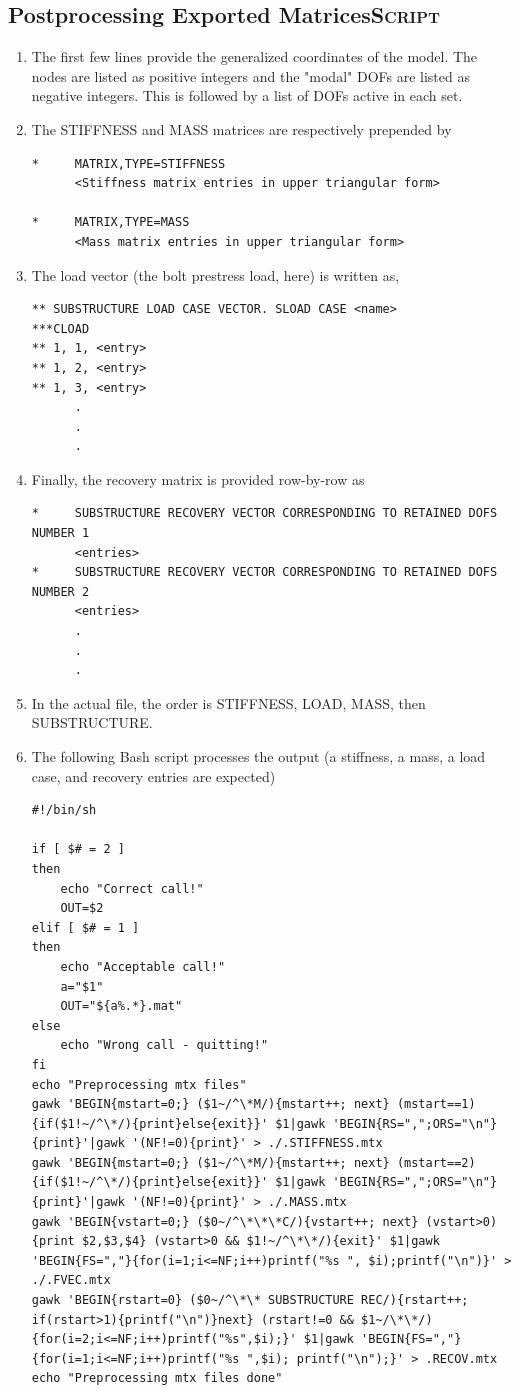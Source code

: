 \documentclass[11pt]{article}
\begin{document}
\subsection{Postprocessing Exported Matrices\hfill{}\textsc{Script}}
\label{sec:orgf2797a8}
\begin{enumerate}
\item The first few lines provide the generalized coordinates of the model. The nodes are listed as positive integers and the "modal" DOFs are listed as negative integers.
This is followed by a list of DOFs active in each set.
\item The STIFFNESS and MASS matrices are respectively prepended by
\begin{verbatim}
*     MATRIX,TYPE=STIFFNESS
      <Stiffness matrix entries in upper triangular form>

*     MATRIX,TYPE=MASS
      <Mass matrix entries in upper triangular form>      
\end{verbatim}
\item The load vector (the bolt prestress load, here) is written as,
\begin{verbatim}
** SUBSTRUCTURE LOAD CASE VECTOR. SLOAD CASE <name>
***CLOAD 
** 1, 1, <entry>
** 1, 2, <entry>
** 1, 3, <entry>
      .
      .
      .
\end{verbatim}
\item Finally, the recovery matrix is provided row-by-row as
\begin{verbatim}
*     SUBSTRUCTURE RECOVERY VECTOR CORRESPONDING TO RETAINED DOFS NUMBER 1
      <entries>
*     SUBSTRUCTURE RECOVERY VECTOR CORRESPONDING TO RETAINED DOFS NUMBER 2
      <entries>
      .
      .
      .
\end{verbatim}
\item In the actual file, the order is STIFFNESS, LOAD, MASS, then SUBSTRUCTURE.
\item The following Bash script processes the output (a stiffness, a mass, a load case, and recovery entries are expected)
\begin{verbatim}
#!/bin/sh

if [ $# = 2 ]
then 
    echo "Correct call!"
    OUT=$2
elif [ $# = 1 ]
then
    echo "Acceptable call!"
    a="$1"
    OUT="${a%.*}.mat"
else
    echo "Wrong call - quitting!"
fi
echo "Preprocessing mtx files"
gawk 'BEGIN{mstart=0;} ($1~/^\*M/){mstart++; next} (mstart==1){if($1!~/^\*/){print}else{exit}}' $1|gawk 'BEGIN{RS=",";ORS="\n"}{print}'|gawk '(NF!=0){print}' > ./.STIFFNESS.mtx
gawk 'BEGIN{mstart=0;} ($1~/^\*M/){mstart++; next} (mstart==2){if($1!~/^\*/){print}else{exit}}' $1|gawk 'BEGIN{RS=",";ORS="\n"}{print}'|gawk '(NF!=0){print}' > ./.MASS.mtx
gawk 'BEGIN{vstart=0;} ($0~/^\*\*\*C/){vstart++; next} (vstart>0){print $2,$3,$4} (vstart>0 && $1!~/^\*\*/){exit}' $1|gawk 'BEGIN{FS=","}{for(i=1;i<=NF;i++)printf("%s ", $i);printf("\n")}' > ./.FVEC.mtx
gawk 'BEGIN{rstart=0} ($0~/^\*\* SUBSTRUCTURE REC/){rstart++; if(rstart>1){printf("\n")}next} (rstart!=0 && $1~/\*\*/){for(i=2;i<=NF;i++)printf("%s",$i);}' $1|gawk 'BEGIN{FS=","}{for(i=1;i<=NF;i++)printf("%s ",$i); printf("\n");}' > .RECOV.mtx
echo "Preprocessing mtx files done"


\end{verbatim}
\end{enumerate}
\end{document}
